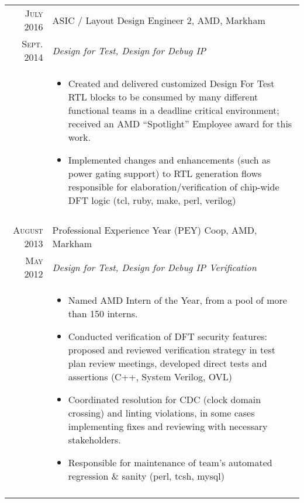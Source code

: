 \documentclass[a4paper,10pt]{article}
\begin{document}
\begin{longtable}{r|p{15cm}}
 \textsc{July 2016} & ASIC / Layout Design Engineer 2, \textsc{AMD}, Markham
\\\textsc{Sept. 2014}&\emph{Design for Test, Design for Debug IP}\\&\footnotesize{

\begin{itemize}\vspace*{-\baselineskip}
  \item Created and delivered customized Design For Test RTL blocks to be consumed by many different functional teams in a deadline critical environment; received an AMD “Spotlight” Employee award for this work.
  \item Implemented changes and enhancements (such as power gating support) to RTL generation flows responsible for elaboration/verification of chip-wide DFT logic (tcl, ruby, make, perl, verilog)
\end{itemize}\vspace*{-\baselineskip}\vspace*{-\baselineskip}

}\\\multicolumn{2}{c}{} \\

 \textsc{August 2013} & Professional Experience Year (PEY) Coop, \textsc{AMD}, Markham
\\\textsc{May 2012}    &\emph{Design for Test, Design for Debug IP Verification}\\
                                     &\footnotesize{
\begin{itemize}\vspace*{-\baselineskip}
  \item Named AMD Intern of the Year, from a pool of more than 150 interns.
  \item Conducted verification of DFT security features: proposed and reviewed verification strategy in test plan review meetings, developed direct tests and assertions (C++, System Verilog, OVL)
  \item Coordinated resolution for CDC (clock domain crossing) and linting violations, in some cases implementing fixes and reviewing with necessary stakeholders.
  \item Responsible for maintenance of team's automated regression \& sanity (perl, tcsh, mysql)
\end{itemize}\vspace*{-\baselineskip}\vspace*{-\baselineskip}
}\\\multicolumn{2}{c}{} \\


\end{longtable}
\end{document}
